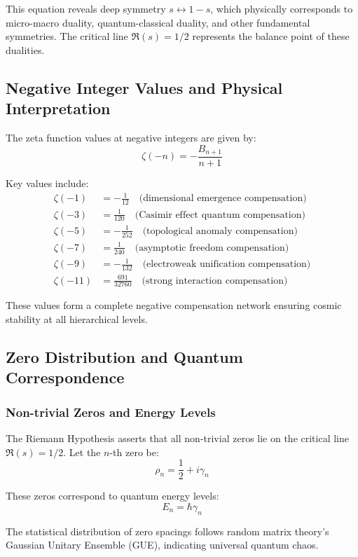 \documentclass[11pt]{article}
\begin{document}
This equation reveals deep symmetry $s \leftrightarrow 1-s$, which physically corresponds to micro-macro duality, quantum-classical duality, and other fundamental symmetries. The critical line $\Re(s) = 1/2$ represents the balance point of these dualities.

\subsection{Negative Integer Values and Physical Interpretation}

The zeta function values at negative integers are given by:
$$\zeta(-n) = -\frac{B_{n+1}}{n+1}$$

Key values include:
\begin{align}
\zeta(-1) &= -\frac{1}{12} \quad \text{(dimensional emergence compensation)} \\
\zeta(-3) &= \frac{1}{120} \quad \text{(Casimir effect quantum compensation)} \\
\zeta(-5) &= -\frac{1}{252} \quad \text{(topological anomaly compensation)} \\
\zeta(-7) &= \frac{1}{240} \quad \text{(asymptotic freedom compensation)} \\
\zeta(-9) &= -\frac{1}{132} \quad \text{(electroweak unification compensation)} \\
\zeta(-11) &= \frac{691}{32760} \quad \text{(strong interaction compensation)}
\end{align}

These values form a complete negative compensation network ensuring cosmic stability at all hierarchical levels.

\subsection{Zero Distribution and Quantum Correspondence}

\subsubsection{Non-trivial Zeros and Energy Levels}

The Riemann Hypothesis asserts that all non-trivial zeros lie on the critical line $\Re(s) = 1/2$. Let the $n$-th zero be:
$$\rho_n = \frac{1}{2} + i\gamma_n$$

These zeros correspond to quantum energy levels:
$$E_n = \hbar \gamma_n$$

The statistical distribution of zero spacings follows random matrix theory's Gaussian Unitary Ensemble (GUE), indicating universal quantum chaos.
\end{document}
